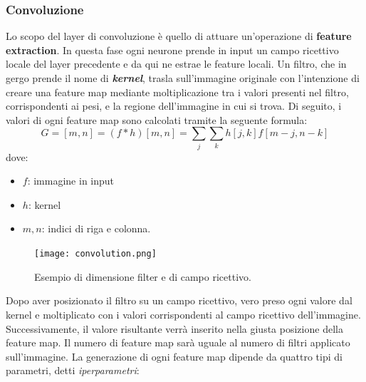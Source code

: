 \subsubsection{Convoluzione}
Lo scopo del layer di convoluzione è quello di attuare un’operazione di {\bfseries{feature 
extraction}}. In questa fase ogni neurone prende in input un campo ricettivo 
locale del layer precedente e da qui ne estrae le feature locali. Un filtro, che in 
gergo prende il nome di {\bfseries{\emph{kernel}}}, trasla sull’immagine originale con l’intenzione di 
creare una feature map mediante moltiplicazione tra i valori presenti nel filtro, 
corrispondenti ai pesi, e la regione dell’immagine in cui si trova. Di seguito, i 
valori di ogni feature map sono calcolati tramite la seguente formula:
\begin{equation}\label{sum convolution}
    G=[m,n] = (f*h)[m,n] = \sum_j\sum_kh[j,k]f[m-j,n-k]
\end{equation}
dove:
\begin{itemize}
    \item $f$: immagine in input
    \item $h$: kernel
    \item $m,n$: indici di riga e colonna.
\end{itemize}
\begin{figure}[H]
    \centering
    \texttt{[image: convolution.png]}
    \centering
    \caption{Esempio di dimensione filter e di campo ricettivo.}
    \label{filter dimension}
\end{figure}
Dopo aver posizionato il filtro su un campo ricettivo, vero preso ogni valore dal 
kernel e moltiplicato con i valori corrispondenti al campo ricettivo dell’immagine. 
Successivamente, il valore risultante verrà inserito nella giusta posizione della 
feature map. Il numero di feature map sarà uguale al numero di filtri applicato 
sull’immagine. La generazione di ogni feature map dipende da quattro tipi di 
parametri, detti 
\emph{iperparametri}:
